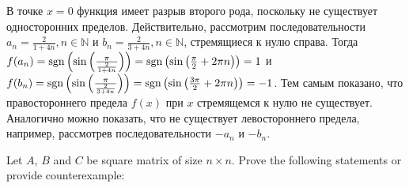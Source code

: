 \documentclass[addpoints]{exam} %
\DeclareMathOperator{\sgn}{\rm sgn}
\begin{document}
\begin{questions}
\begin{solution}
В точке $x=0$ функция имеет разрыв второго рода, поскольку не существует односторонних пределов. Действительно, рассмотрим последовательности $a_n = \frac{2}{1+4 n}, n
\in \mathbb{N}$ и $b_n = \frac{2}{3+4 n}, n \in \mathbb{N}$, стремящиеся к нулю справа. Тогда $f(a_n) = {\sgn} \left(\sin \left( \frac{\pi}{\frac{2}{1+4 n}}\right)\right) = {\sgn} \left( \sin \left( \frac{\pi}{2} + 2 \pi n \right)\right)=1$ и $f(b_n) = {\sgn} \left(\sin \left( \frac{\pi}{\frac{2}{3+4 n}}\right)\right) = {\sgn} \left( \sin \left( \frac{3 \pi}{2} + 2 \pi n \right)\right)=-1$. Тем самым показано, что правостороннего предела $f(x)$ при $x$ стремящемся к нулю не существует. Аналогично можно показать, что не существует левостороннего предела, например, рассмотрев последовательности $-a_n$ и $-b_n$.
\end{solution}





\question Let $A$, $B$ and $C$ be square matrix of size $n\times n$. Prove the following statements or provide counterexample:

\end{questions}
\end{document}

